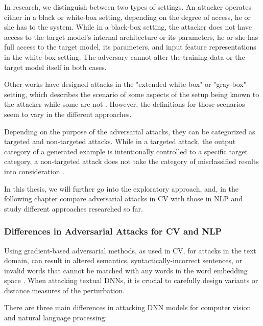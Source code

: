 In research, we distinguish between two types of settings.
An attacker operates either in a black or white-box setting, depending on the degree of access, he or she has to the system. While in a black-box setting, the attacker does not have access to the target model's internal architecture or its parameters, he or she has full access to the target model, its parameters, and input feature representations in the white-box setting. The adversary cannot alter the training data or the target model itself in both cases.

Other works have designed attacks in the "extended white-box" or "gray-box" setting, which describes the scenario of some aspects of the setup being known to the attacker while some are not \cite{vivek2018gray}. However, the definitions for those scenarios seem to vary in the different approaches.

Depending on the purpose of the adversarial attacks, they can be categorized as targeted and non-targeted attacks. While in a targeted attack, the output category of a generated example is intentionally controlled to a specific target category, a non-targeted attack does not take the category of misclassified results into consideration \cite{vijayaraghavan2019generating}.


    \label{sec:adversarial_exapmles_in_text}

In this thesis, we will further go into the exploratory approach, and, in the following chapter compare adversarial attacks in CV with those in NLP and study different approaches researched so far.

\subsubsection{Differences in Adversarial Attacks for CV and NLP }
    \label{sec:differences_in_adv-ex}

Using gradient-based adversarial methods, as used in CV, for attacks in the text domain, can result in altered semantics, syntactically-incorrect sentences, or invalid words that cannot be matched with any words in the word embedding space  \cite{zhang2019adversarial}. When attacking textual DNNs, it is crucial to carefully design variants or distance measures of the perturbation.

There are three main differences in attacking DNN models for computer vision and natural language processing:

